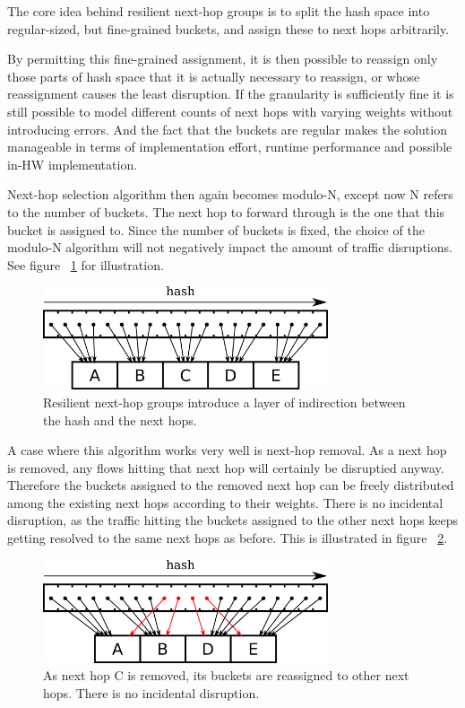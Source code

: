 \documentclass[letterpaper]{article}
\begin{document}
The core idea behind resilient next-hop groups is to split the hash space
into regular-sized, but fine-grained buckets, and assign these to next hops
arbitrarily.

By permitting this fine-grained assignment, it is then possible to reassign
only those parts of hash space that it is actually necessary to reassign,
or whose reassignment causes the least disruption. If the granularity is
sufficiently fine it is still possible to model different counts of next
hops with varying weights without introducing errors. And the fact that the
buckets are regular makes the solution manageable in terms of
implementation effort, runtime performance and possible in-HW
implementation.

Next-hop selection algorithm then again becomes modulo-N, except now N
refers to the number of buckets. The next hop to forward through is the one
that this bucket is assigned to. Since the number of buckets is fixed, the
choice of the modulo-N algorithm will not negatively impact the amount of
traffic disruptions. See figure ~\ref{fig:reshash-stable} for illustration.

\begin{figure}[H]
\includegraphics[width=3.31in]{reshash-stable.png}
\caption{Resilient next-hop groups introduce a layer of indirection between
  the hash and the next hops.}
\label{fig:reshash-stable}
\end{figure}

A case where this algorithm works very well is next-hop removal. As a next
hop is removed, any flows hitting that next hop will certainly be
disruptied anyway. Therefore the buckets assigned to the removed next hop
can be freely distributed among the existing next hops according to their
weights. There is no incidental disruption, as the traffic hitting the
buckets assigned to the other next hops keeps getting resolved to the same
next hops as before. This is illustrated in figure
~\ref{fig:reshash-removal}.

\begin{figure}[H]
\includegraphics[width=3.31in]{reshash-removal.png}
\caption{As next hop C is removed, its buckets are reassigned to other next
  hops. There is no incidental disruption.}
\label{fig:reshash-removal}
\end{figure}
\end{document}
